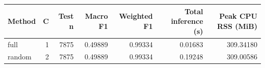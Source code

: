 \begin{tabular}{lrrrrrr}
\toprule
Method & C & Test n & Macro F1 & Weighted F1 & Total inference (s) & Peak CPU RSS (MiB) \\
\midrule
full & 1 & 7875 & 0.49889 & 0.99334 & 0.01683 & 309.34180 \\
random & 2 & 7875 & 0.49889 & 0.99334 & 0.19248 & 309.00586 \\
\bottomrule
\end{tabular}
